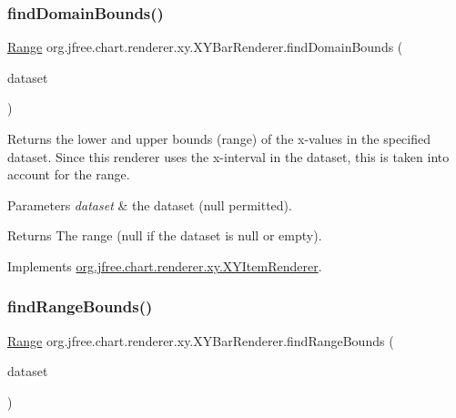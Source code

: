 \subsubsection{\texorpdfstring{find\+Domain\+Bounds()}{findDomainBounds()}}
{\footnotesize\ttfamily \mbox{\hyperlink{classorg_1_1jfree_1_1data_1_1_range}{Range}} org.\+jfree.\+chart.\+renderer.\+xy.\+X\+Y\+Bar\+Renderer.\+find\+Domain\+Bounds (\begin{DoxyParamCaption}\item[{\mbox{\hyperlink{interfaceorg_1_1jfree_1_1data_1_1xy_1_1_x_y_dataset}{X\+Y\+Dataset}}}]{dataset }\end{DoxyParamCaption})}

Returns the lower and upper bounds (range) of the x-\/values in the specified dataset. Since this renderer uses the x-\/interval in the dataset, this is taken into account for the range.


\begin{DoxyParams}{Parameters}
{\em dataset} & the dataset ({\ttfamily null} permitted).\\
\hline
\end{DoxyParams}
\begin{DoxyReturn}{Returns}
The range ({\ttfamily null} if the dataset is {\ttfamily null} or empty). 
\end{DoxyReturn}


Implements \mbox{\hyperlink{interfaceorg_1_1jfree_1_1chart_1_1renderer_1_1xy_1_1_x_y_item_renderer_a77925018c73214f58daac73147ba5e52}{org.\+jfree.\+chart.\+renderer.\+xy.\+X\+Y\+Item\+Renderer}}.

\mbox{\label{classorg_1_1jfree_1_1chart_1_1renderer_1_1xy_1_1_x_y_bar_renderer_a3514a82753d3430f16b2e933546d26cd}} 
\subsubsection{\texorpdfstring{find\+Range\+Bounds()}{findRangeBounds()}}
{\footnotesize\ttfamily \mbox{\hyperlink{classorg_1_1jfree_1_1data_1_1_range}{Range}} org.\+jfree.\+chart.\+renderer.\+xy.\+X\+Y\+Bar\+Renderer.\+find\+Range\+Bounds (\begin{DoxyParamCaption}\item[{\mbox{\hyperlink{interfaceorg_1_1jfree_1_1data_1_1xy_1_1_x_y_dataset}{X\+Y\+Dataset}}}]{dataset }\end{DoxyParamCaption})}

